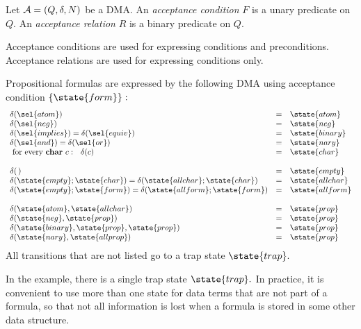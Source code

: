 \begin{definition}
   \label{Def_acc_cond}
   Let $ {\cal A} = ( Q, \delta, N ) $ be a DMA.
   An \emph{acceptance condition} $ F $ is a unary predicate on $ Q. $
   An \emph{acceptance relation} $ R $ is a binary predicate on $ Q. $
\end{definition}
Acceptance conditions are used for expressing conditions and
preconditions. Acceptance relations are used for expressing 
conditions only.
\begin{example}
   Propositional formulas are expressed by the following DMA using
   acceptance condition $ \{ \state{form} \}: $ 
   \[
      \begin{array}{lll}
         \delta( \sel{atom} ) & = & \state{atom} \\
         \delta( \sel{neg} ) & = & \state{neg} \\
         \delta( \sel{implies} ) = 
            \delta( \sel{equiv} ) & = & \state{binary} \\
         \delta( \sel{and} ) = 
            \delta( \sel{or} ) & = & \state{nary} \\
         \mbox{ for every {\bf char} } c : \ \ \delta( c ) & = & \state{char} \\
         \\
         \delta( \, ) & = & \state{empty} \\
         \delta( \state{empty}; \state{char} ) = 
         \delta( \state{allchar}; \state{char} ) & = & \state{allchar} \\
         \delta( \state{empty}; \state{form} ) =
         \delta( \state{allform}; \state{form} ) & = & \state{allform} \\
         \\  
         \delta( \state{atom}, \state{allchar} ) & = & \state{prop} \\
         \delta( \state{neg}, \state{prop} ) & = & \state{prop} \\
         \delta( \state{binary}, \state{prop}, \state{prop} ) & = & \state{prop} \\
         \delta( \state{nary}, \state{allprop} ) & = & \state{prop} \\
      \end{array}
   \]
   All transitions that are not listed go to a trap state $ \state{trap}. $ 
\end{example} 
In the example, there is a single trap state $ \state{trap}. $ In practice,
it is convenient to use more than one state for data terms that are not part
of a formula, so that not all information is lost when a formula
is stored in some other data structure.

